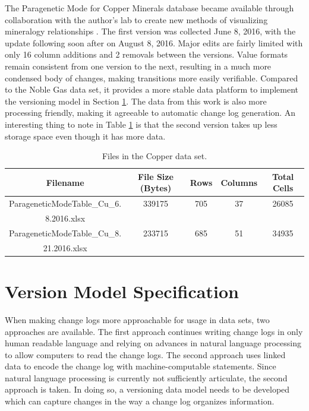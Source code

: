 The Paragenetic Mode for Copper Minerals database became available through collaboration with the author's lab to create new methods of visualizing mineralogy relationships \cite{Morrison2016}.
The first version was collected June 8, 2016, with the update following soon after on August 8, 2016.
Major edits are fairly limited with only 16 column additions and 2 removals between the versions.
Value formats remain consistent from one version to the next, resulting in a much more condensed body of changes, making transitions more easily verifiable.
Compared to the Noble Gas data set, it provides a more stable data platform to implement the versioning model in Section \ref{ch:model}.
The data from this work is also more processing friendly, making it agreeable to automatic change log generation.
An interesting thing to note in Table \ref{copper_file_table} is that the second version takes up less storage space even though it has more data.

\begin{table}
	\caption{Files in the Copper data set.}
	\label{copper_file_table}
	\centering
	\begin{tabular}{|c|c|c|c|c|}
		\hline
		Filename & File Size (Bytes) & Rows & Columns &	Total Cells \\ \hline
		ParageneticModeTable\_Cu\_6. &	339175 & 705 &	37 &	26085\\
		8.2016.xlsx&&&&\\
		ParageneticModeTable\_Cu\_8. & 233715 & 685 & 51 & 34935\\
		21.2016.xlsx&&&&\\
		\hline
	\end{tabular}
\end{table}

\section{Version Model Specification}\label{ch:model}

When making change logs more approachable for usage in data sets, two approaches are available.
The first approach continues writing change logs in only human readable language and relying on advances in natural language processing to allow computers to read the change logs.
The second approach uses linked data to encode the change log with machine-computable statements.
Since natural language processing is currently not sufficiently articulate, the second approach is taken.
In doing so, a versioning data model needs to be developed which can capture changes in the way a change log organizes information.

